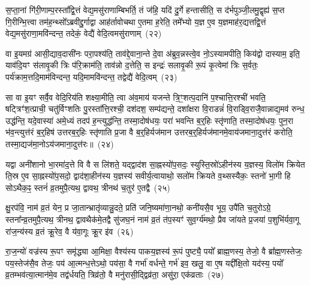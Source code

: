 स॒प्ता॒नां गि॑री॒णाम्प॒रस्ता᳚द्वि॒त्तं वेद्य॒मसु॑राणाम्बिभर्ति॒ तं ज॑हि॒ यदि॑ दु॒र्गे हन्तासीति॒ स द॑र्भपुञ्जी॒लमु॒द्वृह्य॑ स॒प्त गि॒रीन्भि॒त्त्वा तम॑ह॒न्थ्सो᳚\-ऽब्रवीद्दु॒र्गाद्वा आह॑र्तावोचथा ए॒तमा ह॒रेति॒ तमे᳚भ्यो य॒ज्ञ ए॒व य॒ज्ञमाह॑र॒द्यत्तद्वि॒त्तं वेद्य॒मसु॑राणा॒मवि॑न्दन्त॒ तदेकं॒ वेद्यै॑ वेदि॒त्वमसु॑राणाम्~(२२)

वा इ॒यमग्र॑ आसी॒द्याव॒दासी॑नः परा॒पश्य॑ति॒ ताव॑द्दे॒वाना॒न्ते दे॒वा अ॑ब्रुव॒न्नस्त्वे॒व नो॒\-ऽस्यामपीति॒ किय॑द्वो दास्याम॒ इति॒ याव॑दि॒यꣳ स॑लावृ॒की त्रिः प॑रि॒क्राम॑ति॒ ताव॑न्नो द॒त्तेति॒ स इन्द्रः॑ सलावृ॒की रू॒पं कृ॒त्वेमां त्रिः स॒र्वतः॒ पर्य॑क्राम॒त्तदि॒माम॑विन्दन्त॒ यदि॒मामवि॑न्दन्त॒ तद्वेद्यै॑ वेदि॒त्वम्~(२३)

सा वा इ॒यꣳ सर्वै॒व वेदि॒रिय॑ति शक्ष्या॒मीति॒ त्वा अ॑व॒माय॑ यजन्ते त्रि॒ꣳ॒शत्प॒दानि॑ प॒श्चात्ति॒रश्ची॑ भवति॒ षट्त्रिꣳ॑श॒त्प्राची॒ चतु॑र्विꣳशतिः पु॒रस्ता᳚त्ति॒रश्ची॒ दश॑दश॒ सम्प॑द्यन्ते॒ दशा᳚क्षरा वि॒राडन्नं॑ वि॒राड्वि॒राजै॒वान्नाद्य॒मव॑ रुन्ध॒ उद्ध॑न्ति॒ यदे॒वास्या॑ अमे॒ध्यं तदप॑ ह॒न्त्युद्ध॑न्ति॒ तस्मा॒दोष॑धयः॒ परा॑ भवन्ति ब॒र्॒\mbox{}हिः स्तृ॑णाति॒ तस्मा॒दोष॑धयः॒ पुन॒रा भ॑व॒न्त्युत्त॑रं ब॒र्॒\mbox{}हिष॑ उत्तरब॒र्॒\mbox{}हिः स्तृ॑णाति प्र॒जा वै ब॒र्॒\mbox{}हिर्यज॑मान उत्तरब॒र्॒\mbox{}हिर्यज॑मानमे॒वाय॑जमाना॒दुत्त॑रं करोति॒ तस्मा॒द्यज॑मा॒नो\-ऽय॑जमाना॒दुत्त॑रः॥~(२४)

{}%

यद्वा अनी॑शानो भा॒रमा॑द॒त्ते वि वै स लि॑शते॒ यद्द्वाद॑श सा॒ह्नस्यो॑प॒सदः॒ स्युस्ति॒स्रो॑\-ऽहीन॑स्य य॒ज्ञस्य॒ विलो॑म क्रियेत ति॒स्र ए॒व सा॒ह्नस्यो॑प॒सदो॒ द्वाद॑शा॒हीन॑स्य य॒ज्ञस्य॑ सवीर्य॒त्वायाथो॒ सलो॑म क्रियते व॒थ्सस्यैकः॒ स्तनो॑ भा॒गी हि सो\-ऽथैक॒ꣴ॒ स्तनं॑ व्र॒तमुपै॒त्यथ॒ द्वावथ॒ त्रीनथ॑ च॒तुर॑ ए॒तद्वै~(२५)

क्षु॒रप॑वि॒ नाम॑ व्र॒तं येन॒ प्र जा॒तान्भ्रातृ॑व्यान्नु॒दते॒ प्रति॑ जनि॒ष्यमा॑णा॒नथो॒ कनी॑यसै॒व भूय॒ उपै॑ति च॒तुरो\-ऽग्रे॒ स्तना᳚न्व्र॒तमुपै॒त्यथ॒ त्रीनथ॒ द्वावथैक॑मे॒तद्वै सु॑जघ॒नं नाम॑ व्र॒तं त॑प॒स्यꣳ॑ सुव॒र्ग्य॑मथो॒ प्रैव जा॑यते प्र॒जया॑ प॒शुभि॑र्यवा॒गू रा॑ज॒न्य॑स्य व्र॒तं क्रू॒रेव॒ वै य॑वा॒गूः क्रू॒र इ॑व~(२६)

रा॒ज॒न्यो॑ वज्र॑स्य रू॒पꣳ समृ॑द्ध्या आ॒मिक्षा॒ वैश्य॑स्य पाकय॒ज्ञस्य॑ रू॒पं पुष्ट्यै॒ पयो᳚ ब्राह्म॒णस्य॒ तेजो॒ वै ब्रा᳚ह्म॒णस्तेजः॒ पय॒स्तेज॑सै॒व तेजः॒ पय॑ आ॒त्मन्ध॒त्ते\-ऽथो॒ पय॑सा॒ वै गर्भा॑ वर्धन्ते॒ गर्भ॑ इव॒ खलु॒ वा ए॒ष यद्दी᳚क्षि॒तो यद॑स्य॒ पयो᳚ व्र॒तम्भव॑त्या॒त्मान॑मे॒व तद्व॑र्धयति॒ त्रिव्र॑तो॒ वै मनु॑रासी॒द्द्विव्र॑ता॒ असु॑रा॒ एक॑व्रताः~(२७)

